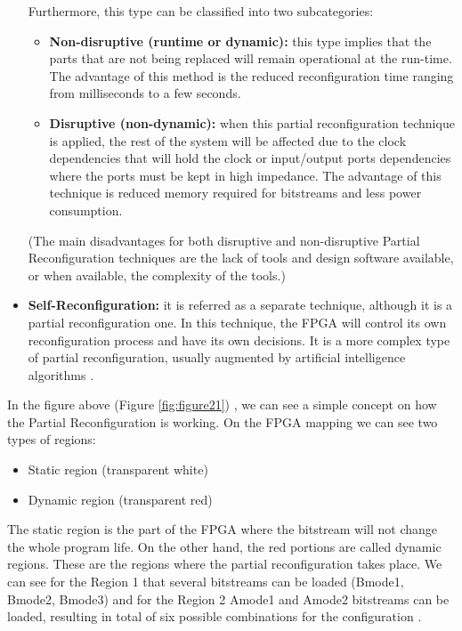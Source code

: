 \documentclass[twoside]{romjist}
\begin{document}
\begin{itemize}
		Furthermore, this type can be classified into two subcategories:
		\begin{itemize}
			\item
			\textbf{Non-disruptive (runtime or dynamic):} this type implies that the parts that are
			not being replaced will remain operational at the run-time. The advantage of
			this method is the reduced reconfiguration time ranging from milliseconds to a
			few seconds.
			\item
			\textbf{Disruptive (non-dynamic):} when this partial reconfiguration technique is
			applied, the rest of the system will be affected due to the clock dependencies
			that will hold the clock or input/output ports dependencies where the ports must
			be kept in high impedance. The advantage of this technique is reduced memory
			required for bitstreams and less power consumption.
		\end{itemize}
		(The main disadvantages for both disruptive and non-disruptive Partial
		Reconfiguration techniques are the lack of tools and design software available, or
		when available, the complexity of the tools.)
		\item
		\textbf{Self-Reconfiguration:} it is referred as a separate technique, although it is a partial
		reconfiguration one. In this technique, the FPGA will control its own reconfiguration
		process and have its own decisions. It is a more complex type of partial reconfiguration,
		usually augmented by artificial intelligence algorithms \cite{7}.
	\end{itemize}
	\hspace{0.5cm}
	In the figure above (Figure \ref{fig:figure21}) \cite{4}, we can see a simple concept on how the Partial
	Reconfiguration is working. On the FPGA mapping we can see two types of regions:
	\begin{itemize}
		\item
		Static region (transparent white)
		\item
		Dynamic region (transparent red)
	\end{itemize}
	\hspace{0.5cm}
	The static region is the part of the FPGA where the bitstream will not change the whole
	program life. On the other hand, the red portions are called dynamic regions. These are the
	regions where the partial reconfiguration takes place. We can see for the Region 1 that
	several bitstreams can be loaded (Bmode1, Bmode2, Bmode3) and for the Region
	2 Amode1 and Amode2 bitstreams can be loaded, resulting in total of six possible
	combinations for the configuration \cite{4}.
	
\end{document}
